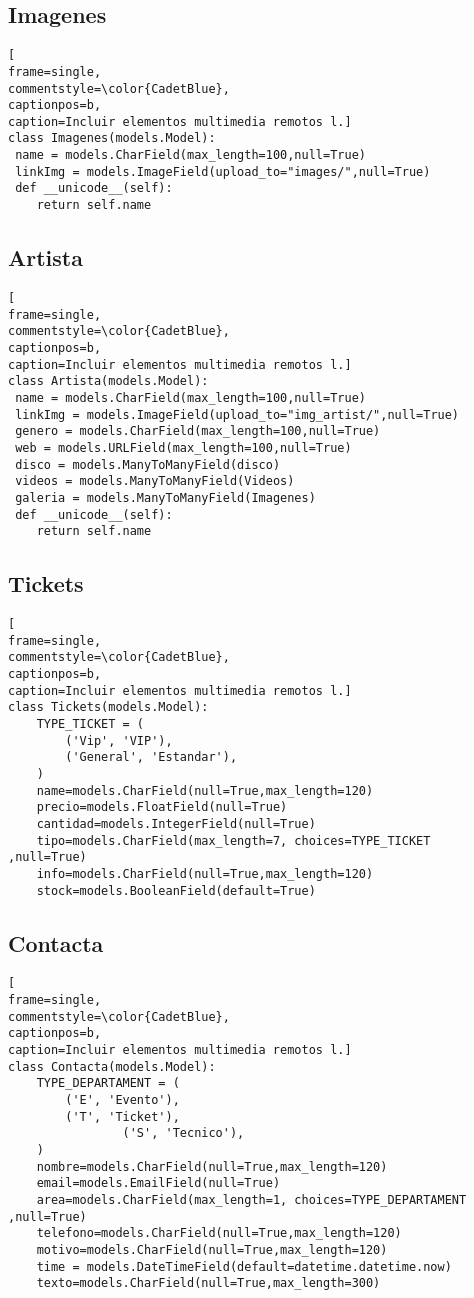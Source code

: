 \subsection{Imagenes}
\begin{lstlisting}[
frame=single,
commentstyle=\color{CadetBlue},
captionpos=b,
caption=Incluir elementos multimedia remotos l.]
class Imagenes(models.Model):
 name = models.CharField(max_length=100,null=True)
 linkImg = models.ImageField(upload_to="images/",null=True)
 def __unicode__(self):
	return self.name
\end{lstlisting}

\subsection{Artista}
\begin{lstlisting}[
frame=single,
commentstyle=\color{CadetBlue},
captionpos=b,
caption=Incluir elementos multimedia remotos l.]
class Artista(models.Model):
 name = models.CharField(max_length=100,null=True)
 linkImg = models.ImageField(upload_to="img_artist/",null=True)
 genero = models.CharField(max_length=100,null=True)
 web = models.URLField(max_length=100,null=True)
 disco = models.ManyToManyField(disco)
 videos = models.ManyToManyField(Videos) 
 galeria = models.ManyToManyField(Imagenes)
 def __unicode__(self):
	return self.name
\end{lstlisting}


\subsection{Tickets}
\begin{lstlisting}[
frame=single,
commentstyle=\color{CadetBlue},
captionpos=b,
caption=Incluir elementos multimedia remotos l.]
class Tickets(models.Model):
	TYPE_TICKET = (
        ('Vip', 'VIP'),
        ('General', 'Estandar'),
    )
	name=models.CharField(null=True,max_length=120)
	precio=models.FloatField(null=True)
	cantidad=models.IntegerField(null=True)
	tipo=models.CharField(max_length=7, choices=TYPE_TICKET ,null=True)
	info=models.CharField(null=True,max_length=120)
	stock=models.BooleanField(default=True)
\end{lstlisting}

\subsection{Contacta}
\begin{lstlisting}[
frame=single,
commentstyle=\color{CadetBlue},
captionpos=b,
caption=Incluir elementos multimedia remotos l.]
class Contacta(models.Model):
	TYPE_DEPARTAMENT = (
        ('E', 'Evento'),
        ('T', 'Ticket'),
				('S', 'Tecnico'),
    )
	nombre=models.CharField(null=True,max_length=120)
	email=models.EmailField(null=True)
	area=models.CharField(max_length=1, choices=TYPE_DEPARTAMENT ,null=True)
	telefono=models.CharField(null=True,max_length=120)
	motivo=models.CharField(null=True,max_length=120)
 	time = models.DateTimeField(default=datetime.datetime.now)
	texto=models.CharField(null=True,max_length=300)
\end{lstlisting}

